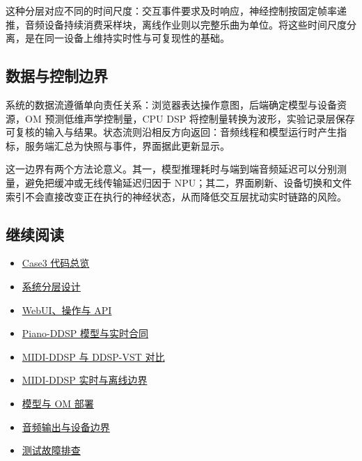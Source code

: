这种分层对应不同的时间尺度：交互事件要求及时响应，神经控制按固定帧率递推，音频设备持续消费采样块，离线作业则以完整乐曲为单位。将这些时间尺度分离，是在同一设备上维持实时性与可复现性的基础。

\subsection{数据与控制边界}\label{src-experiment-case3-module-map}

系统的数据流遵循单向责任关系：浏览器表达操作意图，后端确定模型与设备资源，OM
预测低维声学控制量，CPU DSP
将控制量转换为波形，实验记录层保存可复核的输入与结果。状态流则沿相反方向返回：音频线程和模型运行时产生指标，服务端汇总为快照与事件，界面据此更新显示。

这一边界有两个方法论意义。其一，模型推理耗时与端到端音频延迟可以分别测量，避免把缓冲或无线传输延迟归因于
NPU；其二，界面刷新、设备切换和文件索引不会直接改变正在执行的神经状态，从而降低交互层扰动实时链路的风险。

\subsection{继续阅读}\label{src-experiment-case3-further-reading}

\begin{itemize}
\tightlist
\item
  \href{https://github.com/zhouxzh/Ascend310/tree/main/samples/case3}{Case3
  代码总览}
\item
  \href{https://github.com/zhouxzh/Ascend310/blob/main/samples/case3/docs/01-overview.md}{系统分层设计}
\item
  \href{https://github.com/zhouxzh/Ascend310/blob/main/samples/case3/docs/02-webui.md}{WebUI、操作与
  API}
\item
  \href{https://github.com/zhouxzh/Ascend310/blob/main/samples/case3/docs/04-piano-ddsp.md}{Piano-DDSP
  模型与实时合同}
\item
  \href{https://github.com/zhouxzh/Ascend310/blob/main/samples/case3/docs/13-midi-ddsp-vs-ddsp-vst.md}{MIDI-DDSP
  与 DDSP-VST 对比}
\item
  \href{https://github.com/zhouxzh/Ascend310/blob/main/samples/case3/docs/05-midi-ddsp-realtime.md}{MIDI-DDSP
  实时与离线边界}
\item
  \href{https://github.com/zhouxzh/Ascend310/blob/main/samples/case3/docs/03-om-deployment.md}{模型与
  OM 部署}
\item
  \href{https://github.com/zhouxzh/Ascend310/blob/main/samples/case3/docs/06-audio-output.md}{音频输出与设备边界}
\item
  \href{https://github.com/zhouxzh/Ascend310/blob/main/samples/case3/docs/11-troubleshooting.md}{测试故障排查}
\end{itemize}

